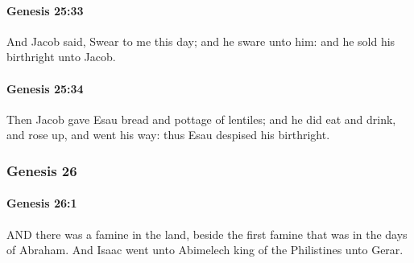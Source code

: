 		\paragraph{Genesis 25:33} %
			\label{GENESIS-25-33}

			And Jacob said, Swear to me this day; and he sware unto him: and he sold his birthright unto Jacob.


		\paragraph{Genesis 25:34} %
			\label{GENESIS-25-34}

			Then Jacob gave Esau bread and pottage of lentiles; and he did eat and drink, and rose up, and went his way: thus Esau despised his birthright.


	\subsubsection{Genesis 26} %
		\label{GENESIS-26}
		
		\paragraph{Genesis 26:1} %
			\label{GENESIS-26-1}

			AND there was a famine in the land, beside the first famine that was in the days of Abraham.  And Isaac went unto Abimelech king of the Philistines unto Gerar.

